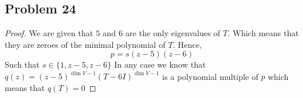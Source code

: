 \documentclass[a4paper]{report}
\begin{document}
\subsection*{Problem 24}
\begin{proof}
   We are given that $5$ and $6$ are the only eigenvalues of $T$. Which means that they are zeroes of the minimal polynomial  of $T$. Hence, 
   $$ p = s (z - 5)(z - 6) $$ 
   Such that $s \in \{1, z - 5, z- 6\}$ 
   In any case we know that $q(z) = (z - 5)^{\dim V - 1} (T - 6I)^{\dim V - 1}$ is a polynomial multiple of $p$ which means that $q(T) = 0$
\end{proof}
\end{document}

